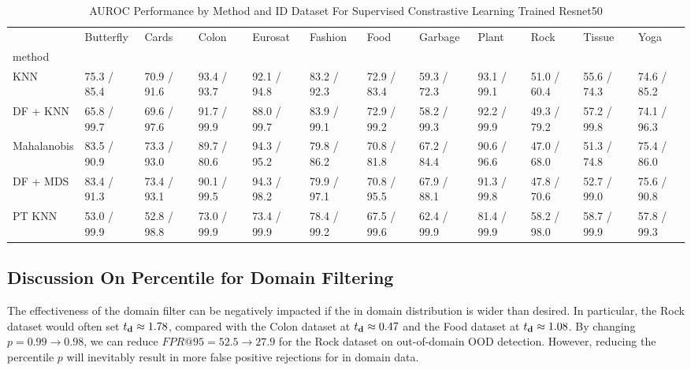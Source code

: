 \documentclass[letterpaper]{article} %
\theoremstyle{plain}
\theoremstyle{definition}
\theoremstyle{remark}
\begin{document}
\begin{table}
\caption{AUROC Performance by Method and ID Dataset For Supervised Constrastive Learning Trained Resnet50}


\label{tab:auroc_results_simclr}
\begin{tabular}{llllllllllll}
\toprule
 & Butterfly & Cards & Colon & Eurosat & Fashion & Food & Garbage & Plant & Rock & Tissue & Yoga \\
method &  &  &  &  &  &  &  &  &  &  &  \\
\midrule
KNN & 75.3 / 85.4 & 70.9 / 91.6 & 93.4 / 93.7 & 92.1 / 94.8 & 83.2 / 92.3 & 72.9 / 83.4 & 59.3 / 72.3 & 93.1 / 99.1 & 51.0 / 60.4 & 55.6 / 74.3 & 74.6 / 85.2 \\
DF + KNN & 65.8 / 99.7 & 69.6 / 97.6 & 91.7 / 99.9 & 88.0 / 99.7 & 83.9 / 99.1 & 72.9 / 99.2 & 58.2 / 99.3 & 92.2 / 99.9 & 49.3 / 79.2 & 57.2 / 99.8 & 74.1 / 96.3 \\
Mahalanobis & 83.5 / 90.9 & 73.3 / 93.0 & 89.7 / 80.6 & 94.3 / 95.2 & 79.8 / 86.2 & 70.8 / 81.8 & 67.2 / 84.4 & 90.6 / 96.6 & 47.0 / 68.0 & 51.3 / 74.8 & 75.4 / 86.0 \\
DF + MDS & 83.4 / 91.3 & 73.4 / 93.1 & 90.1 / 99.5 & 94.3 / 98.2 & 79.9 / 97.1 & 70.8 / 95.5 & 67.9 / 88.1 & 91.3 / 99.8 & 47.8 / 70.6 & 52.7 / 99.0 & 75.6 / 90.8 \\
PT KNN & 53.0 / 99.9 & 52.8 / 98.8 & 73.0 / 99.9 & 73.4 / 99.9 & 78.4 / 99.2 & 67.5 / 99.6 & 62.4 / 99.9 & 81.4 / 99.9 & 58.2 / 98.0 & 58.7 / 99.9 & 57.8 / 99.3 \\
\bottomrule
\end{tabular}

\end{table}

\subsection{Discussion On Percentile for Domain Filtering}

The effectiveness of the domain filter can be negatively impacted if the in domain distribution is wider than desired. In particular, the Rock dataset \citep{rock_data} would often set $t_{\mathbf{d}} \approx 1.78$, compared with the Colon dataset at $t_{\mathbf{d}} \approx 0.47$ and the Food dataset at $t_{\mathbf{d}} \approx 1.08$. By changing $p=0.99\to0.98$, we can reduce $FPR@95=52.5\to27.9 $ for the Rock dataset on out-of-domain OOD detection. However, reducing the percentile $p$ will inevitably result in more false positive rejections for in domain data. 
\end{document}
